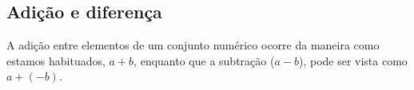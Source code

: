 \subsection{Adição e diferença}

A adição entre elementos de um conjunto numérico ocorre da maneira como estamos habituados, $a+b$, enquanto que a subtração ($a-b$), pode ser vista como $a+(-b)$. 